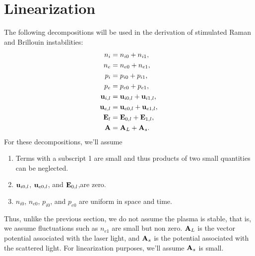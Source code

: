 \documentclass[a4paper,11pt]{report}
\begin{document}
\section{Linearization}
The following decompositions will be used in the derivation of stimulated Raman and Brillouin instabilities:
\begin{align}
    n_i &= n_{i0} + n_{i1}, \nonumber \\
    n_e &= n_{e0} + n_{e1}, \nonumber \\
    p_i &= p_{i0} + p_{i1}, \nonumber \\
    p_e &= p_{e0} + p_{e1}, \nonumber \\
    \mathbf{u}_{i,l} &= \mathbf{u}_{i0,l} + \mathbf{u}_{i1,l}, \nonumber \\
    \mathbf{u}_{e,l} &= \mathbf{u}_{e0,l} + \mathbf{u}_{e1,l}, \nonumber \\
    \mathbf{E}_l &= \mathbf{E}_{0,l} + \mathbf{E}_{1,l}, \nonumber \\
    \mathbf{A} &= \mathbf{A}_L + \mathbf{A}_s.
\end{align}
For these decompositions, we'll assume
\begin{enumerate}
    \item Terms with a subscript 1 are small and thus products of two small quantities can be neglected. \label{it:p_instabilities_assumption_1}
    \item $\mathbf{u}_{i0,l}$, $\mathbf{u}_{e0,l}$, and $\mathbf{E}_{0,l}$,are zero. \label{it:p_instabilities_assumption_2}
    \item $n_{i0}$, $n_{e0}$, $p_{i0}$, and $p_{e0}$ are uniform in space and time. \label{it:p_instabilities_assumption_3}
\end{enumerate}

Thus, unlike the previous section, we do not assume the plasma is stable, that is, we assume fluctuations such as $n_{e1}$ are small but non zero. $\mathbf{A}_L$ is the vector potential associated with the laser light, and $\mathbf{A}_s$ is the potential associated with the scattered light. For linearization purposes, we'll assume $\mathbf{A}_s$ is small. 
\end{document}
